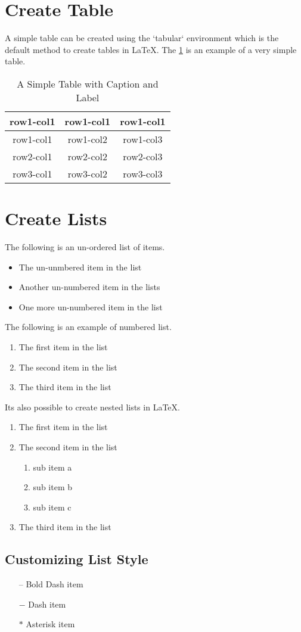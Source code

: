 \documentclass[12pt, letter]{article}
\begin{document}
\listoftables
\newpage

\section{Create Table}
A simple table can be created using the `tabular` environment which is the default method to create tables in LaTeX. The \ref{table1} is an example of  a very simple table.

\begin{table}[h!]
  \centering
  \caption{A Simple Table with Caption and Label}
  \label{table1}
  \begin{tabular}{ c c c }
    \hline
    row1-col1 & row1-col1 & row1-col1 \\
    \hline
    row1-col1 & row1-col2 & row1-col3 \\
    row2-col1 & row2-col2 & row2-col3 \\
    row3-col1 & row3-col2 & row3-col3 \\
    \hline
  \end{tabular}
\end{table}

\section{Create Lists}
The following is an un-ordered list of items.

\begin{itemize}
  \item The un-unmbered item in the list
  \item Another un-numbered item in the lists
  \item One more un-numbered item in the list
\end{itemize}

The following is an example of numbered list.

\begin{enumerate}
  \item The first item in the list
  \item The second item in the list
  \item The third item in the list
\end{enumerate}

Its also possible to create nested lists in \LaTeX.

\begin{enumerate}
  \item The first item in the list
  \item The second item in the list
        \begin{enumerate}
          \item sub item a
          \item sub item b
          \item sub item c
        \end{enumerate}
   \item The third item in the list
\end{enumerate}

\subsection{Customizing List Style}
\begin{itemize}
	\item[--] Bold Dash item
    \item[$-$] Dash item
    \item[$\ast$] Asterisk item
\end{itemize}
\end{document}
